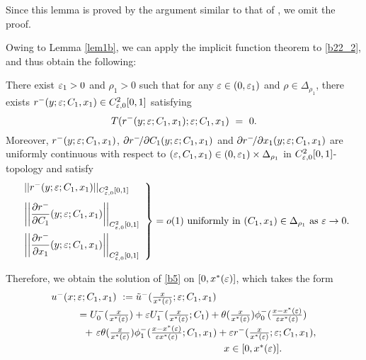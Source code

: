 \documentclass[a4,10pt]{article}
\begin{document}
Since this lemma is proved by the argument similar to that of \cite[Lemma 4.3]{MTH}, we omit the proof. 

Owing to Lemma \ref{lem1b}, we can apply the implicit function theorem to \eqref{b22_2}, and thus obtain the following: 
\begin{prop}\label{prop1b} 
There exist $\varepsilon_1 > 0$ and $\rho_1 > 0$ such that for any $\varepsilon \in (0,\varepsilon_1)$ and $\rho \in \Delta_{\rho_1}$, there exists $r^-(y;\varepsilon;C_1,x_1) \in C^2_{\varepsilon,0}[0,1]$ satisfying 
%
$$   
T(r^-(y;\ep;C_1,x_1);\ep;C_1,x_1) \ = \ 0. 
$$
%
Moreover, $r^-(y;\varepsilon;C_1,x_1)$, $\partial r^- \! / \partial C_1(y;\varepsilon;C_1,x_1)$ and $\partial r^- \! / \partial x_1(y;\varepsilon;C_1,x_1)$ are uniformly continuous with respect to $(\varepsilon,C_1,x_1) \in (0, \varepsilon_1) \times \Delta_{\rho_1}$ in $C^2_{\varepsilon,0}[0,1]$-topology and satisfy 
\begin{equation*}
\left. 
\begin{array}{l}
 ||r^-(y;\ep;C_1,x_1) ||_{C^2_{\ep,0}[0,1]} \\[2ex]
\displaystyle{ \left|\left| \frac {\partial r^-}{\partial C_1}(y;\ep;C_1,x_1) \right|\right|_{C^2_{\ep,0}[0,1] }} \\[3ex]
\displaystyle{ \left|\left| \frac {\partial r^-}{\partial x_1}(y;\ep;C_1,x_1) \right|\right|_{C^2_{\ep,0}[0,1] }}
\end{array} 
\right\}
= o(1) \  \mbox{uniformly in} \ (C_1,x_1) \in \Delta_{\rho_1} \ \mbox{as} \ \ep \to 0. 
\end{equation*}
\end{prop}

Therefore, we obtain the solution of \eqref{b5} on $[0, x^*(\varepsilon)]$, which takes the form
%
\begin{equation}\label{b34}
\begin{array}{l}
u^-(x ; \ep;C_1,x_1)  \ :=  \tilde{u}^-(\frac{x}{x^*(\ep)}; \ep; C_1,x_1) \\[1ex]
\hspace*{1cm}  = U^-_0( \frac{x}{x^*(\ep)}) + \ep U^-_1(\frac{x}{x^*(\ep)};C_1) + \theta(\frac{x}{x^*(\ep)}) \phi^-_0( \frac{x-x^*(\ep)}{\ep x^*(\ep)}) \\[1ex]
\hspace{1.2cm} 
+ \  \ep \theta(\frac{x}{x^*(\ep)}) \phi^-_1(   \frac{x-x^*(\ep)}{\ep x^*(\ep)};C_1,x_1) + \ep r^-(\frac{x}{x^*(\ep)};\ep;C_1,x_1 ), \\[1ex]
\hspace*{6cm} \ x \in [0, x^*(\ep)]. 
\end{array}
\end{equation}
\end{document}
